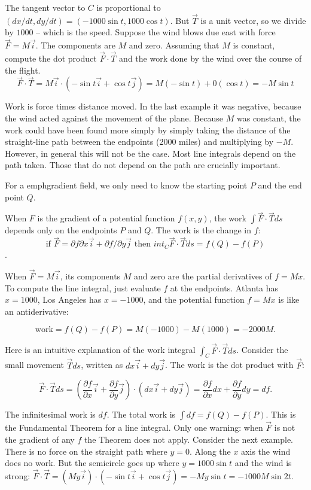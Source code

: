 The tangent vector to $C$ is proportional to $(dx/dt, dy/dt) = (-1000 \sin t, 1000 \cos t)$.
But $\vec T$ is a unit vector, so we divide by $1000$ -- which is the speed.
{
Suppose the wind blows due east with force $\vec F = M\vec i$. The components are $M$ and
zero. Assuming that $M$ is constant, compute the dot product $\vec F \cdot \vec T$ and the work done by the wind over the course of the flight.}
{
$$\vec F \cdot \vec T= M\vec i \cdot(-\sin t \vec i+\cos t \vec j)= M(-\sin t)+0(\cos t)= -M \sin t$$ 
}

Work is force times distance moved. In the last example it was negative, because the wind acted against the movement of the plane. Because $M$ was constant, the work could have been found more simply by simply taking the distance of the straight-line path between the endpoints
 (2000 miles) and multiplying by $- M$. However, in general this will not be the case.
Most line integrals depend on the path taken. Those that do not depend on the path are crucially important.

For a emph{gradient field}, we only need to know the starting point $P$ and the end point $Q$.

{
When $F$ is the gradient of a potential function $f (x, y)$, the work $\int \vec F \cdot \vec T ds$ depends only on the endpoints $P$ and $Q$. The work is the change in $f$:
$$\text{if } \vec F = \partial f \partial x \vec i + \partial f/\partial y \vec j \text{ then } int_C \vec F \cdot \vec T ds = f (Q) - f(P)$$.
}

When $\vec F = M \vec i$, its components $M$ and zero are the partial derivatives of $f = Mx$. To
compute the line integral, just evaluate $f$ at the endpoints. Atlanta has $x = 1000$, Los
Angeles has $x = - 1000$, and the potential function $f = Mx$ is like an antiderivative:

$$\text{work} = f (Q) - f (P) = M(- 1000) - M(1000) = - 2000M.$$


Here is an intuitive explanation of the work integral $\int_C \vec F \cdot \vec T ds$. Consider the small movement $\vec T ds$, written as $dx \vec i + dy \vec j$. The work is the dot product
with $\vec F$:

$$\vec F \cdot \vec T ds=\left(\dfrac{\partial f}{\partial x}\vec i + \dfrac{\partial f}{\partial y}\vec j \right)\cdot \left(dx \vec i +dy \vec j \right)=\dfrac{\partial f}{\partial x}dx+\dfrac{\partial f}{\partial y}dy=df.$$

The infinitesimal work is $df$. The total work is $\int df= f(Q) - f (P)$. This is the Fundamental
Theorem for a line integral. Only one warning: when $\vec F$ is not the gradient of any
$f$ the Theorem does not apply. Consider the next example.
{There is no force on the straight path where $y = 0$. Along the $x$ axis the wind does
no work. But the semicircle goes up where $y = 1000 \sin t$ and the wind is strong:
$\vec F \cdot \vec T=(My \vec i)\cdot(-\sin t \vec i+\cos t \vec j)= -My \sin t= - 1000M \sin 2t$.}

